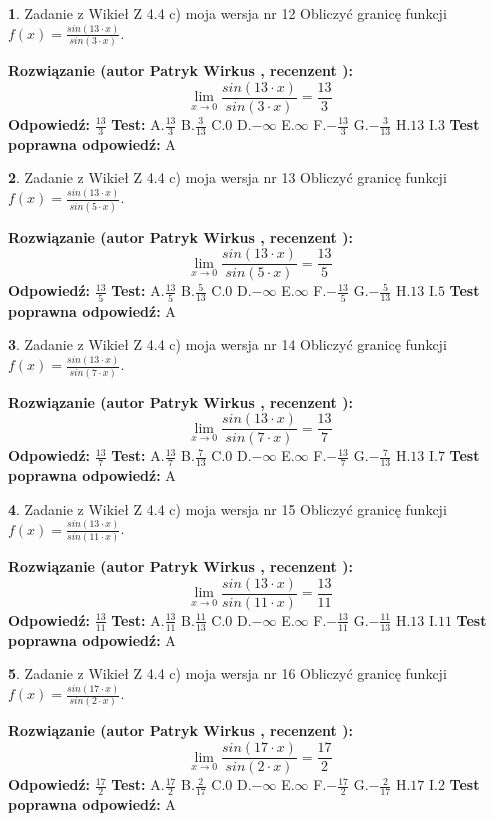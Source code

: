 \documentclass[12pt, a4paper]{article}
\theoremstyle{definition} %
\newtheorem{zad}{}
\newcommand{\zadStart}[1]{\begin{zad}#1\newline}
\newcommand{\zadStop}{\end{zad}}
\newcommand{\rozwStart}[2]{\noindent \textbf{Rozwiązanie (autor #1 , recenzent #2): }\newline}
\newcommand{\rozwStop}{\newline}
\newcommand{\odpStart}{\noindent \textbf{Odpowiedź:}\newline}
\newcommand{\odpStop}{\newline}
\newcommand{\testStart}{\noindent \textbf{Test:}\newline}
\newcommand{\testStop}{\newline}
\newcommand{\kluczStart}{\noindent \textbf{Test poprawna odpowiedź:}\newline}
\newcommand{\kluczStop}{\newline}
\begin{document}
\zadStart{Zadanie z Wikieł Z 4.4 c) moja wersja nr 12}
Obliczyć granicę funkcji $f(x)=\frac{sin(13\cdot x)}{sin(3\cdot x)}$.
\zadStop
\rozwStart{Patryk Wirkus}{}
$$\lim\limits_{x\to 0}\frac{sin(13\cdot x)}{sin(3\cdot x)}=
\frac{13}{3}$$
\rozwStop
\odpStart
$\frac{13}{3}$
\odpStop
\testStart
A.$\frac{13}{3}$
B.$\frac{3}{13}$
C.$0$
D.$-\infty$
E.$\infty$
F.$-\frac{13}{3}$
G.$-\frac{3}{13}$
H.$13$
I.$3$
\testStop
\kluczStart
A
\kluczStop



\zadStart{Zadanie z Wikieł Z 4.4 c) moja wersja nr 13}
Obliczyć granicę funkcji $f(x)=\frac{sin(13\cdot x)}{sin(5\cdot x)}$.
\zadStop
\rozwStart{Patryk Wirkus}{}
$$\lim\limits_{x\to 0}\frac{sin(13\cdot x)}{sin(5\cdot x)}=
\frac{13}{5}$$
\rozwStop
\odpStart
$\frac{13}{5}$
\odpStop
\testStart
A.$\frac{13}{5}$
B.$\frac{5}{13}$
C.$0$
D.$-\infty$
E.$\infty$
F.$-\frac{13}{5}$
G.$-\frac{5}{13}$
H.$13$
I.$5$
\testStop
\kluczStart
A
\kluczStop



\zadStart{Zadanie z Wikieł Z 4.4 c) moja wersja nr 14}
Obliczyć granicę funkcji $f(x)=\frac{sin(13\cdot x)}{sin(7\cdot x)}$.
\zadStop
\rozwStart{Patryk Wirkus}{}
$$\lim\limits_{x\to 0}\frac{sin(13\cdot x)}{sin(7\cdot x)}=
\frac{13}{7}$$
\rozwStop
\odpStart
$\frac{13}{7}$
\odpStop
\testStart
A.$\frac{13}{7}$
B.$\frac{7}{13}$
C.$0$
D.$-\infty$
E.$\infty$
F.$-\frac{13}{7}$
G.$-\frac{7}{13}$
H.$13$
I.$7$
\testStop
\kluczStart
A
\kluczStop



\zadStart{Zadanie z Wikieł Z 4.4 c) moja wersja nr 15}
Obliczyć granicę funkcji $f(x)=\frac{sin(13\cdot x)}{sin(11\cdot x)}$.
\zadStop
\rozwStart{Patryk Wirkus}{}
$$\lim\limits_{x\to 0}\frac{sin(13\cdot x)}{sin(11\cdot x)}=
\frac{13}{11}$$
\rozwStop
\odpStart
$\frac{13}{11}$
\odpStop
\testStart
A.$\frac{13}{11}$
B.$\frac{11}{13}$
C.$0$
D.$-\infty$
E.$\infty$
F.$-\frac{13}{11}$
G.$-\frac{11}{13}$
H.$13$
I.$11$
\testStop
\kluczStart
A
\kluczStop



\zadStart{Zadanie z Wikieł Z 4.4 c) moja wersja nr 16}
Obliczyć granicę funkcji $f(x)=\frac{sin(17\cdot x)}{sin(2\cdot x)}$.
\zadStop
\rozwStart{Patryk Wirkus}{}
$$\lim\limits_{x\to 0}\frac{sin(17\cdot x)}{sin(2\cdot x)}=
\frac{17}{2}$$
\rozwStop
\odpStart
$\frac{17}{2}$
\odpStop
\testStart
A.$\frac{17}{2}$
B.$\frac{2}{17}$
C.$0$
D.$-\infty$
E.$\infty$
F.$-\frac{17}{2}$
G.$-\frac{2}{17}$
H.$17$
I.$2$
\testStop
\kluczStart
A
\kluczStop
\end{document}
